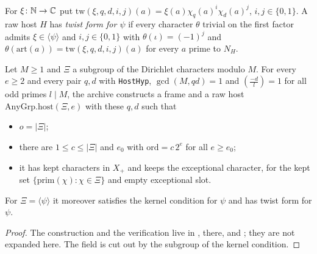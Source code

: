 \begin{definition}\label{host:twist-form}
For $\xi\colon\mathbb{N}\to\mathbb{C}$ put $\mathrm{tw}(\xi,q,d,i,j)(a)=\xi(a)\chi_q(a)^i
\chi_d(a)^j$, $i,j\in\{0,1\}$. A raw host $H$ has \emph{twist form for
$\psi$} if every character $\theta$ trivial on the first factor admits
$\xi\in\langle\psi\rangle$ and $i,j\in\{0,1\}$ with $\theta(\iota)=(-1)^j$
and $\theta(\mathrm{art}(a))=\mathrm{tw}(\xi,q,d,i,j)(a)$ for every $a$
prime to $N_H$.
\end{definition}

\begin{lemma}\label{host:any-grp}
Let $M\ge1$ and $\Xi$ a subgroup of the Dirichlet characters modulo $M$.
For every $e\ge2$ and every pair $q,d$ with \texttt{HostHyp}, $\gcd(M,qd)=1$
and $\left(\frac{-d}{l}\right)=1$ for all odd primes $l\mid M$, the archive
constructs a frame and a raw host $\mathrm{AnyGrp.host}(\Xi,e)$ with these
$q,d$ such that
\begin{itemize}
\item $o=|\Xi|$;
\item there are $1\le c\le|\Xi|$ and $e_0$ with $\mathrm{ord}=c\,2^e$ for
  all $e\ge e_0$;
\item it has kept characters in $X_+$ and keeps the exceptional character,
  for the kept set $\{\mathrm{prim}(\chi):\chi\in\Xi\}$ and empty
  exceptional slot.
\end{itemize}
For $\Xi=\langle\psi\rangle$ it moreover satisfies the kernel condition
for $\psi$ and has twist form for $\psi$.
\end{lemma}
\begin{proof}
The construction and the verification live in
,
 there, and
;
they are not expanded here. The field is cut out by the subgroup of the
kernel condition.
\end{proof}

